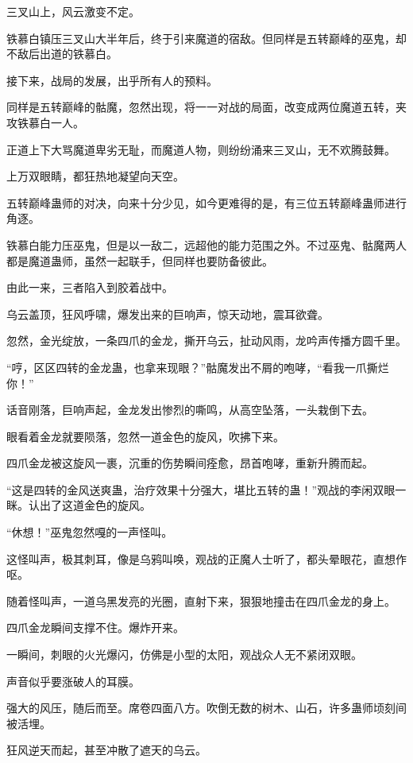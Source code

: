 
\begin{this_body}

三叉山上，风云激变不定。

铁慕白镇压三叉山大半年后，终于引来魔道的宿敌。但同样是五转巅峰的巫鬼，却不敌后出道的铁慕白。

接下来，战局的发展，出乎所有人的预料。

同样是五转巅峰的骷魔，忽然出现，将一一对战的局面，改变成两位魔道五转，夹攻铁慕白一人。

正道上下大骂魔道卑劣无耻，而魔道人物，则纷纷涌来三叉山，无不欢腾鼓舞。

上万双眼睛，都狂热地凝望向天空。

五转巅峰蛊师的对决，向来十分少见，如今更难得的是，有三位五转巅峰蛊师进行角逐。

铁慕白能力压巫鬼，但是以一敌二，远超他的能力范围之外。不过巫鬼、骷魔两人都是魔道蛊师，虽然一起联手，但同样也要防备彼此。

由此一来，三者陷入到胶着战中。

乌云盖顶，狂风呼啸，爆发出来的巨响声，惊天动地，震耳欲聋。

忽然，金光绽放，一条四爪的金龙，撕开乌云，扯动风雨，龙吟声传播方圆千里。

“哼，区区四转的金龙蛊，也拿来现眼？”骷魔发出不屑的咆哮，“看我一爪撕烂你！”

话音刚落，巨响声起，金龙发出惨烈的嘶鸣，从高空坠落，一头栽倒下去。

眼看着金龙就要陨落，忽然一道金色的旋风，吹拂下来。

四爪金龙被这旋风一裹，沉重的伤势瞬间痊愈，昂首咆哮，重新升腾而起。

“这是四转的金风送爽蛊，治疗效果十分强大，堪比五转的蛊！”观战的李闲双眼一眯。认出了这道金色的旋风。

“休想！”巫鬼忽然嘎的一声怪叫。

这怪叫声，极其刺耳，像是乌鸦叫唤，观战的正魔人士听了，都头晕眼花，直想作呕。

随着怪叫声，一道乌黑发亮的光圈，直射下来，狠狠地撞击在四爪金龙的身上。

四爪金龙瞬间支撑不住。爆炸开来。

一瞬间，刺眼的火光爆闪，仿佛是小型的太阳，观战众人无不紧闭双眼。

声音似乎要涨破人的耳膜。

强大的风压，随后而至。席卷四面八方。吹倒无数的树木、山石，许多蛊师顷刻间被活埋。

狂风逆天而起，甚至冲散了遮天的乌云。


\end{this_body}
